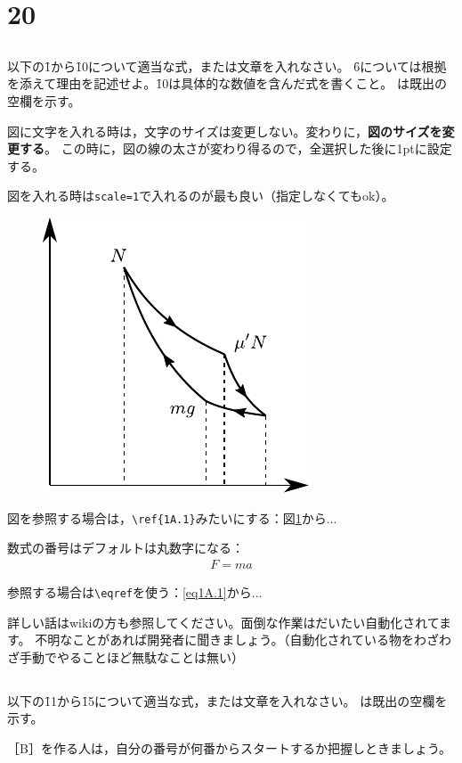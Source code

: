 \documentclass[a4paper, papersize, dvipdfmx, 12pt, fleqn, bold, ideographic]{jsarticle}
\begin{document}
\section{20}

\subsection{}
以下の\f{1}から\f{10}について適当な式，または文章を入れなさい。
\f{6}については根拠を添えて理由を記述せよ。\f{10}は具体的な数値を含んだ式を書くこと。
\ff{　}は既出の空欄を示す。

\bigskip %

図に文字を入れる時は，文字のサイズは変更しない。変わりに，\textbf{図のサイズを変更する}。
この時に，図の線の太さが変わり得るので，全選択した後に1ptに設定する。

図を入れる時は\verb|scale=1|で入れるのが最も良い（指定しなくてもok）。

\begin{figure}[ht]
  \centering
  \includegraphics[scale=1]{fig1A_1.pdf}
  \caption{}
  \label{1A.1}
\end{figure}

図を参照する場合は，\verb|\ref{1A.1}|みたいにする：図\ref{1A.1}から...

数式の番号はデフォルトは丸数字になる：
\begin{align}
  F=ma\label{eq1A.1}
\end{align}

参照する場合は\verb|\eqref|を使う：\eqref{eq1A.1}から...

詳しい話はwikiの方も参照してください。面倒な作業はだいたい自動化されてます。
不明なことがあれば開発者に聞きましょう。（自動化されている物をわざわざ手動でやることほど無駄なことは無い）

\newpage

\emptypage

\subsection{}
以下の\f{11}から\f{15}について適当な式，または文章を入れなさい。
\ff{　}は既出の空欄を示す。

［B］を作る人は，自分の番号が何番からスタートするか把握しときましょう。
\end{document}
